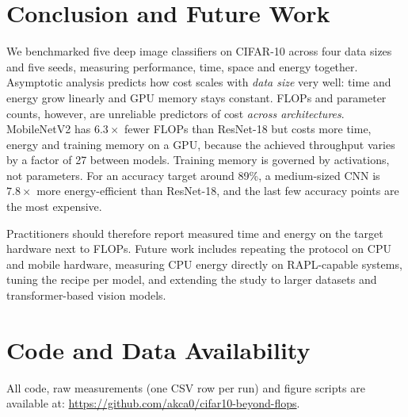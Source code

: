\documentclass[conference]{IEEEtran}
\begin{document}
\section{Conclusion and Future Work}
We benchmarked five deep image classifiers on CIFAR-10 across four data sizes and five seeds, measuring performance, time, space and energy together. Asymptotic analysis predicts how cost scales with \emph{data size} very well: time and energy grow linearly and GPU memory stays constant. FLOPs and parameter counts, however, are unreliable predictors of cost \emph{across architectures}. MobileNetV2 has $6.3\times$ fewer FLOPs than ResNet-18 but costs more time, energy and training memory on a GPU, because the achieved throughput varies by a factor of 27 between models. Training memory is governed by activations, not parameters. For an accuracy target around 89\%, a medium-sized CNN is $7.8\times$ more energy-efficient than ResNet-18, and the last few accuracy points are the most expensive.

Practitioners should therefore report measured time and energy on the target hardware next to FLOPs. Future work includes repeating the protocol on CPU and mobile hardware, measuring CPU energy directly on RAPL-capable systems, tuning the recipe per model, and extending the study to larger datasets and transformer-based vision models.

\section*{Code and Data Availability}
All code, raw measurements (one CSV row per run) and figure scripts are available at: \url{https://github.com/akca0/cifar10-beyond-flops}.



\end{document}

